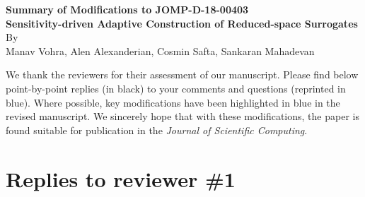 \documentclass[11pt,final]{article}
\newcommand{\referee}[1]{\vspace{.1ex}\noindent{\textcolor{blue}{#1}}}
\begin{document}
\begin{center}
{\bf Summary of Modifications to JOMP-D-18-00403}\\[6pt]
{\bf Sensitivity-driven Adaptive Construction of Reduced-space Surrogates}\\[6pt]
By \\
Manav Vohra, Alen Alexanderian, Cosmin Safta, Sankaran Mahadevan 
\end{center}

\baselineskip=22pt


\vspace*{1in}

We thank the reviewers for their assessment of our manuscript. Please find
below point-by-point replies (in black) to your comments and questions
(reprinted in blue). Where possible, key modifications have been highlighted
in blue in the revised manuscript. We sincerely hope that with these
modifications, the paper is found suitable for publication in the
{\it Journal of Scientific Computing}.

\clearpage


\section{Replies to reviewer \#1}
\referee{This draft proposed a systematic approach for surrogate model construction in
reduced input parameter spaces in order to reduce the number of model
evaluations. The key idea is to approximate the screening parameter iteratively
in order to identify the unimportant inputs. The screening procedure also
integrates with the adaptive construction of a surrogate in the reduced space
to improve the efficiency of the methods. Several numerical examples are used
to demonstrate the efficiency and accuracy of the proposed framework.}
\end{document}
